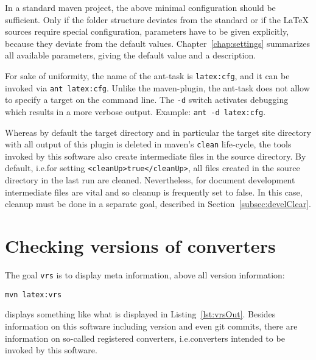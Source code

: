% 



In a standard maven project, 
the above minimal configuration should be sufficient. 
Only if the folder structure deviates from the standard 
or if the \LaTeX{} sources require special configuration, 
parameters have to be given explicitly, 
because they deviate from the default values. 
Chapter~\ref{chap:settings} summarizes all available parameters, 
giving the default value and a description. 


For sake of uniformity, 
the name of the ant-task is \texttt{latex:cfg}, 
and it can be invoked via \texttt{ant latex:cfg}. 
Unlike the maven-plugin, the ant-task 
does not allow to specify a target on the command line. 
The \texttt{-d} switch activates debugging 
which results in a more verbose output. 
Example: \texttt{ant -d latex:cfg}. 

Whereas by default the target directory and in particular 
the target site directory with all output of this plugin is deleted 
in maven's \texttt{clean} life-cycle, 
the tools invoked by this software also create intermediate files 
in the source directory. 
By default, i.e.\@ for setting \texttt{<cleanUp>true</cleanUp>}, 
all files created in the source directory in the last run are cleaned. 
Nevertheless, for document development intermediate files are vital 
and so cleanup is frequently set to false. 
In this case, cleanup must be done in a separate goal, 
described in Section~\ref{subsec:develClear}. 



\section{Checking versions of converters}\label{sec:chkVersions}

The goal \texttt{vrs} is to display meta information, above all version information:
% 
\begin{Verbatim}
mvn latex:vrs
\end{Verbatim}
%
displays something like what is displayed in Listing~\ref{lst:vrsOut}. 
Besides information on this software including version and even git commits, 
there are information on so-called registered converters, 
i.e.\@ converters intended to be invoked by this software. 

